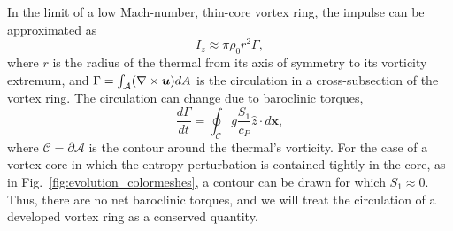 In the limit of a low Mach-number, thin-core vortex ring, the impulse can be approximated as
\begin{equation}
I_z \approx \pi \rho_0 r^2 \Gamma,
\label{eqn:impulse_approx}
\end{equation}
where $r$ is the radius of the thermal from its axis of symmetry to its vorticity extremum, and $\Gamma = \int_{\mathcal{A}} (\nabla\times\bm{u})dA$ is the circulation in a cross-subsection of the vortex ring.
The circulation can change due to baroclinic torques,
\begin{equation}
\frac{d\Gamma}{dt} = \oint_{\mathcal{C}} g \frac{S_1}{c_P}\hat{z} \cdot d\bm{x},
\label{eqn:circulation}
\end{equation}
where $\mathcal{C}=\partial \mathcal{A}$ is the contour around the thermal's vorticity.
For the case of a vortex core in which the entropy perturbation is contained tightly in the core, as in Fig.~\ref{fig:evolution_colormeshes}, a contour can be drawn for which $S_1\approx0$.
Thus, there are no net baroclinic torques, and we will treat the circulation of a developed vortex ring as a conserved quantity.


